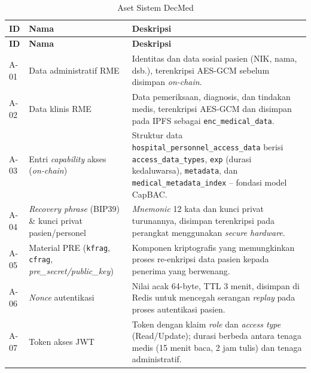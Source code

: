 \begin{xltabular}{\textwidth}{|>{\centering\arraybackslash}p{1.2cm}|>{\raggedright\arraybackslash}p{3.5cm}|X|}
    \caption{Aset Sistem DecMed}
    \label{tab:aset} \\
    \hline
    \textbf{ID} & \textbf{Nama} & \textbf{Deskripsi} \\
    \hline
    \endfirsthead
    \hline
    \textbf{ID} & \textbf{Nama} & \textbf{Deskripsi} \\
    \hline
    \endhead
    \hline
    \endfoot
    \hline
    \endlastfoot

    A-01 & Data administratif RME & Identitas dan data sosial pasien (NIK, nama, dsb.), terenkripsi AES-GCM sebelum disimpan \textit{on-chain}. \\
    \hline

    A-02 & Data klinis RME & Data pemeriksaan, diagnosis, dan tindakan medis, terenkripsi AES-GCM dan disimpan pada IPFS sebagai \texttt{enc\_medical\_data}. \\
    \hline

    A-03 & Entri \textit{capability} akses (\textit{on-chain}) & Struktur data \texttt{hospital\_personnel\_access\_data} berisi \texttt{access\_data\_types}, \texttt{exp} (durasi kedaluwarsa), \texttt{metadata}, dan \texttt{medical\_metadata\_index} -- fondasi model CapBAC. \\
    \hline

    A-04 & \textit{Recovery phrase} (BIP39) \& kunci privat pasien/personel & \textit{Mnemonic} 12 kata dan kunci privat turunannya, disimpan terenkripsi pada perangkat menggunakan \textit{secure hardware}. \\
    \hline

    A-05 & Material PRE (\texttt{kfrag}, \texttt{cfrag}, \textit{pre\_secret/public\_key}) & Komponen kriptografis yang memungkinkan proses re-enkripsi data pasien kepada penerima yang berwenang. \\
    \hline

    A-06 & \textit{Nonce} autentikasi & Nilai acak 64-byte, TTL 3 menit, disimpan di Redis untuk mencegah serangan \textit{replay} pada proses autentikasi pasien. \\
    \hline

    A-07 & Token akses JWT & Token dengan klaim \textit{role} dan \textit{access type} (Read/Update); durasi berbeda antara tenaga medis (15 menit baca, 2 jam tulis) dan tenaga administratif. \\
    \hline


\end{xltabular}
